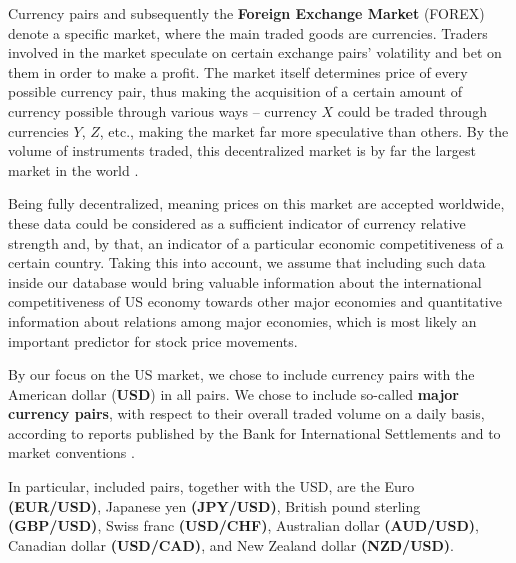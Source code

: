 Currency pairs and subsequently the \textbf{Foreign Exchange Market} (FOREX) denote a specific market, where the main traded goods are currencies. Traders involved in the market speculate 
on certain exchange pairs' volatility and bet on them in order to make a profit. The market itself determines
price of every possible currency pair, thus making the acquisition of a certain amount of currency possible through various ways – currency $X$ could be
traded through currencies $Y$, $Z$, etc., making the market far more speculative than others. By the volume of instruments traded, this decentralized 
market is by far the largest market in the world \cite{forex1}.
\par
Being fully decentralized, meaning prices on this market are accepted worldwide, these data could be considered as a sufficient
indicator of currency relative strength and, by that, an indicator of a particular economic competitiveness of a certain country. Taking this into account,
we assume that including such data inside our database would bring valuable information about the international competitiveness of US economy towards other major economies 
and quantitative information about relations among major economies, which is most likely an important predictor for stock price movements.
\par
By our focus on the US market, we chose to include currency pairs with the American dollar (\textbf{USD}) in all pairs. We chose to include so-called \textbf{major currency pairs},
with respect to their overall traded volume on a daily basis, according to reports published by the Bank for International Settlements and to market conventions \cite{bis_report, forex1}.
\par
In particular, included pairs, together with the USD, are the Euro \textbf{(EUR/USD)}, Japanese yen \textbf{(JPY/USD)}, British pound sterling \textbf{(GBP/USD)}, Swiss franc \textbf{(USD/CHF)}, Australian dollar \textbf{(AUD/USD)}, Canadian dollar \textbf{(USD/CAD)}, and New Zealand dollar \textbf{(NZD/USD)}.

